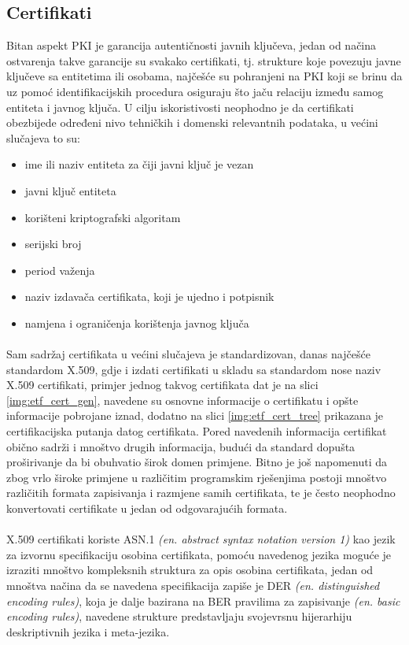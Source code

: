\subsection{Certifikati}
Bitan aspekt PKI je garancija autentičnosti javnih ključeva, jedan od načina ostvarenja takve garancije su svakako certifikati, tj. strukture koje povezuju javne ključeve sa entitetima ili osobama, najčešće su pohranjeni na PKI koji se brinu da uz pomoć identifikacijskih procedura osiguraju što jaču relaciju između samog entiteta i javnog ključa. U cilju iskoristivosti neophodno je da certifikati obezbijede određeni nivo tehničkih i domenski relevantnih podataka, u većini slučajeva to su:

\begin{itemize}
    \item ime ili naziv entiteta za čiji javni ključ je vezan
    \item javni ključ entiteta
    \item korišteni kriptografski algoritam
    \item serijski broj
    \item period važenja
    \item naziv izdavača certifikata, koji je ujedno i potpisnik
    \item namjena i ograničenja korištenja javnog ključa
\end{itemize}

\paragraph*{}
Sam sadržaj certifikata u većini slučajeva je standardizovan, danas najčešće standardom X.509, gdje i izdati certifikati u skladu sa standardom nose naziv X.509 certifikati, primjer jednog takvog certifikata dat je na slici \ref{img:etf_cert_gen}, navedene su osnovne informacije o certifikatu i opšte informacije pobrojane iznad, dodatno na slici \ref{img:etf_cert_tree} prikazana je certifikacijska putanja datog certifikata. Pored navedenih informacija certifikat obično sadrži i mnoštvo drugih informacija, budući da standard dopušta proširivanje da bi obuhvatio širok domen primjene. Bitno je još napomenuti da zbog vrlo široke primjene u različitim programskim rješenjima postoji mnoštvo različitih formata zapisivanja i razmjene samih certifikata, te je često neophodno konvertovati certifikate u jedan od odgovarajućih formata.

\paragraph*{}
X.509 certifikati koriste ASN.1 \textit{(en. abstract syntax notation version 1)} kao jezik za izvornu specifikaciju osobina certifikata, pomoću navedenog jezika moguće je izraziti mnoštvo kompleksnih struktura za opis osobina certifikata, jedan od mnoštva načina da se navedena specifikacija zapiše je DER \textit{(en. distinguished encoding rules)}, koja je dalje bazirana na BER pravilima za zapisivanje \textit{(en. basic encoding rules)}, navedene strukture predstavljaju svojevrsnu hijerarhiju deskriptivnih jezika i meta-jezika.

